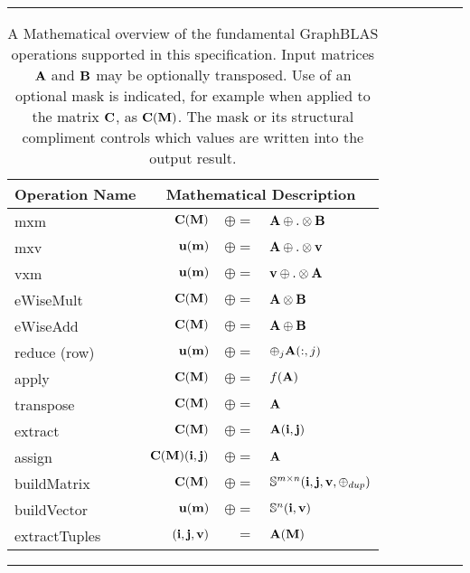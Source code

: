 \begin{table*}[h]
\hrule
\begin{center}
\caption{A Mathematical overview of the fundamental GraphBLAS operations supported
in this specification.  Input matrices ${\bf A}$ and ${\bf B}$ may be optionally
transposed.   Use of an optional mask is indicated, for example when applied to the matrix  ${\bf C}$, 
as ${\bf C}({\bf M})$. The mask or its structural compliment controls 
which values are written into the output result.}
\label{Tab:GraphBLASOps}
\begin{tabular}{l|rrl}
{\sf Operation Name} & \multicolumn{3}{c}{Mathematical Description}  \\
\hline
{\sf mxm}          & ${\bf C}({\bf M})$ & $\oplus=$ & ${\bf A} \oplus.\otimes {\bf B}$  \\
{\sf mxv}          & ${\bf u}({\bf m})$ & $\oplus=$ & ${\bf A} \oplus.\otimes {\bf v}$  \\
{\sf vxm}          & ${\bf u}({\bf m})$ & $\oplus=$ & ${\bf v} \oplus.\otimes {\bf A}$  \\
{\sf eWiseMult}    & ${\bf C}({\bf M})$ & $\oplus=$ & ${\bf A} \otimes {\bf B}$  \\
{\sf eWiseAdd}     & ${\bf C}({\bf M})$ & $\oplus=$ & ${\bf A} \oplus  {\bf B}$  \\
{\sf reduce} (row) & ${\bf u}({\bf m})$ & $\oplus=$ & $\oplus_j{\bf A}(:,j)$  \\
{\sf apply}        & ${\bf C}({\bf M})$ & $\oplus=$ & $f({\bf A})$ \\
{\sf transpose}    & ${\bf C}({\bf M})$ & $\oplus=$ & ${\bf A}$ \\
{\sf extract}      & ${\bf C}({\bf M})$ & $\oplus=$ & ${\bf A}({\bf i},{\bf j})$ \\
{\sf assign}       & ${\bf C}({\bf M})({\bf i},{\bf j})$ & $\oplus=$ & ${\bf A}$ \\
{\sf buildMatrix}  & ${\bf C}({\bf M})$ & $\oplus=$ & $\mathbb{S}^{m\times n}({\bf i},{\bf j},{\bf v},\oplus_{dup})$ \\
{\sf buildVector}  & ${\bf u}({\bf m})$ & $\oplus=$ & $\mathbb{S}^{n}({\bf i},{\bf v})$ \\
{\sf extractTuples}& $({\bf i},{\bf j},{\bf v})$ & $=$ & ${\bf A}({\bf M})$ \\
\end{tabular}
\end{center}
\hrule
\end{table*}




